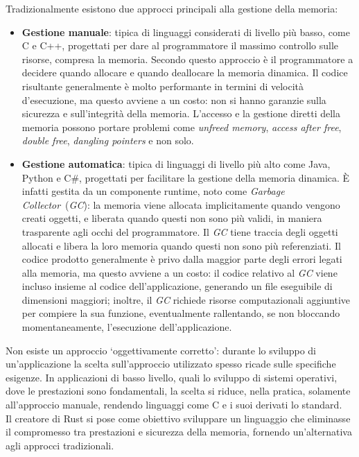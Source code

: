 Tradizionalmente esistono due approcci principali alla gestione della memoria:
\begin{itemize}
    \item \textbf{Gestione manuale}: tipica di linguaggi considerati di livello più basso, come C e C++, progettati per dare al programmatore il massimo controllo sulle risorse, compresa la memoria. Secondo questo approccio è il programmatore a decidere quando allocare e quando deallocare la memoria dinamica. Il codice risultante generalmente è molto performante in termini di velocità d'esecuzione, ma questo avviene a un costo: non si hanno garanzie sulla sicurezza e sull'integrità della memoria. L'accesso e la gestione diretti della memoria possono portare problemi come \textit{unfreed memory}, \textit{access after free}, \textit{double free}, \textit{dangling pointers} e non solo.
    \item \textbf{Gestione automatica}: tipica di linguaggi di livello più alto come Java, Python e C\#, progettati per facilitare la gestione della memoria dinamica. È infatti gestita da un componente runtime, noto come \textit{Garbage Collector}~(\textit{GC}): la memoria viene allocata implicitamente quando vengono creati oggetti, e liberata quando questi non sono più validi, in maniera trasparente agli occhi del programmatore. Il \textit{GC} tiene traccia degli oggetti allocati e libera la loro memoria quando questi non sono più referenziati. Il codice prodotto generalmente è privo dalla maggior parte degli errori legati alla memoria, ma questo avviene a un costo: il codice relativo al \textit{GC} viene incluso insieme al codice dell'applicazione, generando un file eseguibile di dimensioni maggiori; inoltre, il \textit{GC} richiede risorse computazionali aggiuntive per compiere la sua funzione, eventualmente rallentando, se non bloccando momentaneamente, l'esecuzione dell'applicazione.
\end{itemize}
Non esiste un approccio `oggettivamente corretto': durante lo sviluppo di un'applicazione 
la scelta sull'approccio utilizzato spesso ricade sulle specifiche esigenze.
In applicazioni di basso livello, quali lo sviluppo di sistemi operativi, dove le prestazioni sono fondamentali, la scelta si riduce, 
nella pratica, solamente all'approccio manuale, rendendo linguaggi come C e i suoi derivati lo standard.\hfill
\vspace{15pt}\\
Il creatore di Rust si pose come obiettivo sviluppare un linguaggio che eliminasse il compromesso tra prestazioni e sicurezza della memoria, fornendo un'alternativa agli approcci tradizionali.

